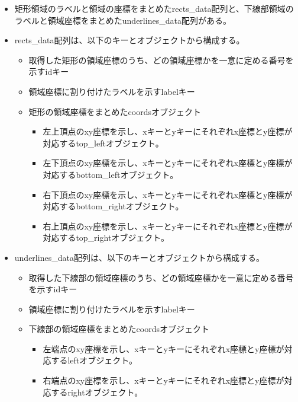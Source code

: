 \begin{itemize}
    \item 矩形領域のラベルと領域の座標をまとめたrects\_data配列と、下線部領域のラベルと領域座標をまとめたunderlines\_data配列がある。
    \item rects\_data配列は、以下のキーとオブジェクトから構成する。
        \begin{itemize}
            \item 取得した矩形の領域座標のうち、どの領域座標かを一意に定める番号を示すidキー
            \item 領域座標に割り付けたラベルを示すlabelキー
            \item 矩形の領域座標をまとめたcoordsオブジェクト
            \begin{itemize}
                \item 左上頂点のxy座標を示し、xキーとyキーにそれぞれx座標とy座標が対応するtop\_leftオブジェクト。
                \item 左下頂点のxy座標を示し、xキーとyキーにそれぞれx座標とy座標が対応するbottom\_leftオブジェクト。
                \item 右下頂点のxy座標を示し、xキーとyキーにそれぞれx座標とy座標が対応するbottom\_rightオブジェクト。
                \item 右上頂点のxy座標を示し、xキーとyキーにそれぞれx座標とy座標が対応するtop\_rightオブジェクト。
            \end{itemize}
        \end{itemize}
    \item underlines\_data配列は、以下のキーとオブジェクトから構成する。
        \begin{itemize}
            \item 取得した下線部の領域座標のうち、どの領域座標かを一意に定める番号を示すidキー
            \item 領域座標に割り付けたラベルを示すlabelキー
            \item 下線部の領域座標をまとめたcoordsオブジェクト
            \begin{itemize}
                \item 左端点のxy座標を示し、xキーとyキーにそれぞれx座標とy座標が対応するleftオブジェクト。
                \item 右端点のxy座標を示し、xキーとyキーにそれぞれx座標とy座標が対応するrightオブジェクト。
            \end{itemize}
        \end{itemize}
\end{itemize}

